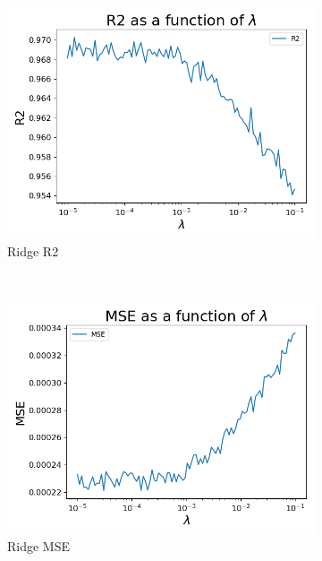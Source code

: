 \documentclass[12pt]{article}
\begin{document}
\begin{figure}[H]
\centering
\begin{subfigure}[t]{0.48\textwidth}
\includegraphics[width=\linewidth]{../figures/Taske_RidgeR2.png}
\caption{Ridge R2}
\label{figRD:RR2}
\end{subfigure}
\ \
\begin{subfigure}[t]{0.48\textwidth}
\includegraphics[width = \linewidth]{../figures/Taske_RidgeMSE.png}
\caption{Ridge MSE}
\label{figRD:RMSE}
\end{subfigure}
\\
\begin{subfigure}[t]{0.48\textwidth}

\end{subfigure}
\end{figure}
\end{document}
